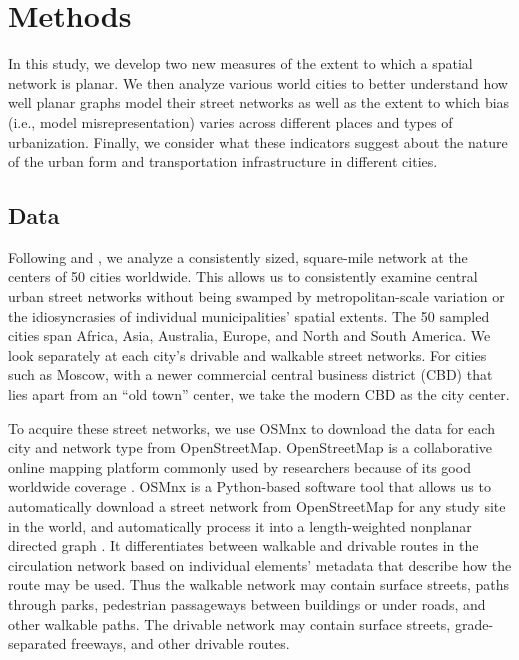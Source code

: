 \documentclass[Afour,sageh,times]{sagej}
\begin{document}
\section{Methods}

In this study, we develop two new measures of the extent to which a spatial network is planar. We then analyze various world cities to better understand how well planar graphs model their street networks as well as the extent to which bias (i.e., model misrepresentation) varies across different places and types of urbanization. Finally, we consider what these indicators suggest about the nature of the urban form and transportation infrastructure in different cities.

\subsection{Data}

Following \citet{jacobs_great_1995} and \citet{cardillo_structural_2006}, we analyze a consistently sized, square-mile network at the centers of 50 cities worldwide. This allows us to consistently examine central urban street networks without being swamped by metropolitan-scale variation or the idiosyncrasies of individual municipalities' spatial extents. The 50 sampled cities span Africa, Asia, Australia, Europe, and North and South America. We look separately at each city's drivable and walkable street networks. For cities such as Moscow, with a newer commercial central business district (CBD) that lies apart from an \enquote{old town} center, we take the modern CBD as the city center.

To acquire these street networks, we use OSMnx to download the data for each city and network type from OpenStreetMap. OpenStreetMap is a collaborative online mapping platform commonly used by researchers because of its good worldwide coverage \citep{haklay_how_2010,jokar_arsanjani_openstreetmap_2015}. OSMnx is a Python-based software tool that allows us to automatically download a street network from OpenStreetMap for any study site in the world, and automatically process it into a length-weighted nonplanar directed graph \citep{boeing_osmnx:_2017}. It differentiates between walkable and drivable routes in the circulation network based on individual elements' metadata that describe how the route may be used. Thus the walkable network may contain surface streets, paths through parks, pedestrian passageways between buildings or under roads, and other walkable paths. The drivable network may contain surface streets, grade-separated freeways, and other drivable routes.
\end{document}
